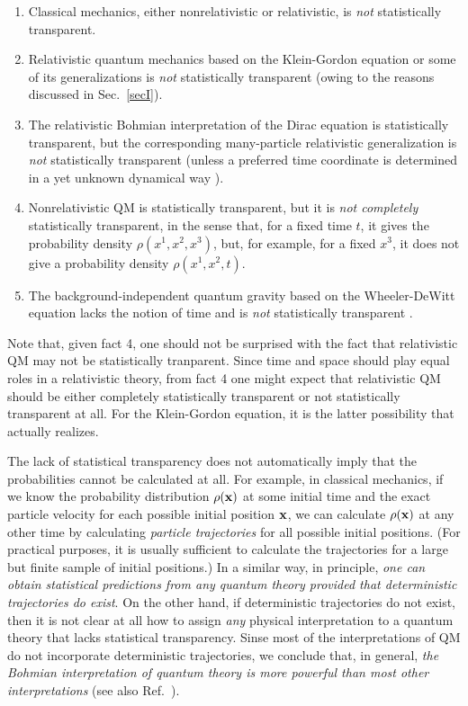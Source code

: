 \documentclass[12pt]{article}
\begin{document}
\begin{enumerate}
%
\item Classical mechanics, either nonrelativistic or relativistic, 
is {\em not} statistically transparent.
%
\item Relativistic quantum mechanics based on the Klein-Gordon 
equation or some of its generalizations is {\em not} 
statistically transparent (owing to the reasons discussed in Sec.~\ref{secI}).
%
\item The relativistic Bohmian interpretation of the
Dirac equation is statistically transparent, 
but the corresponding
many-particle relativistic generalization is {\em not} 
statistically transparent \cite{bern} (unless a preferred time 
coordinate is determined in a yet unknown dynamical way \cite{durr99}).
%
\item Nonrelativistic QM is statistically transparent, 
but it is {\em not completely} statistically transparent, 
in the sense that, for a fixed time $t$, it gives the probability  
density $\rho(x^1,x^2,x^3)$, but, for example, 
for a fixed $x^3$, it does not give a probability  
density $\rho(x^1,x^2,t)$.
%
\item The background-independent quantum gravity based on 
the Wheeler-DeWitt equation lacks the notion of time 
and is {\em not} statistically transparent \cite{kuc,ish}.
\end{enumerate}

Note that, given fact 4, one should not be surprised 
with the fact that relativistic QM may not be statistically tranparent.
Since time and space should play equal roles in a relativistic 
theory, from fact 4 one might expect that 
relativistic QM should be either 
completely statistically transparent or not statistically 
transparent at all. For the Klein-Gordon equation, it is 
the latter possibility that actually realizes.

The lack of statistical transparency does not automatically imply 
that the probabilities cannot be calculated at all. For example, 
in classical mechanics, if we know the probability distribution 
$\rho({\bf x})$ at some initial time and 
the exact particle velocity for each possible initial position 
${\bf x}$, we can calculate $\rho({\bf x})$ at any 
other time by calculating {\em particle trajectories} for all 
possible initial positions. 
(For practical purposes, it is usually sufficient to calculate 
the trajectories for a large but finite sample of initial positions.)
In a similar way, in principle, {\em one can obtain statistical 
predictions from any quantum theory provided that deterministic 
trajectories do exist}. On the other hand, if deterministic 
trajectories do not exist, then it is not clear at all how to assign 
{\em any} physical interpretation to a quantum theory that 
lacks statistical transparency. 
Sinse most of the interpretations 
of QM do not incorporate deterministic trajectories, we conclude 
that, in general, {\em the Bohmian interpretation of quantum theory 
is more powerful than most other interpretations} 
(see also Ref.~\cite{nikoldbb3}).
\end{document}
